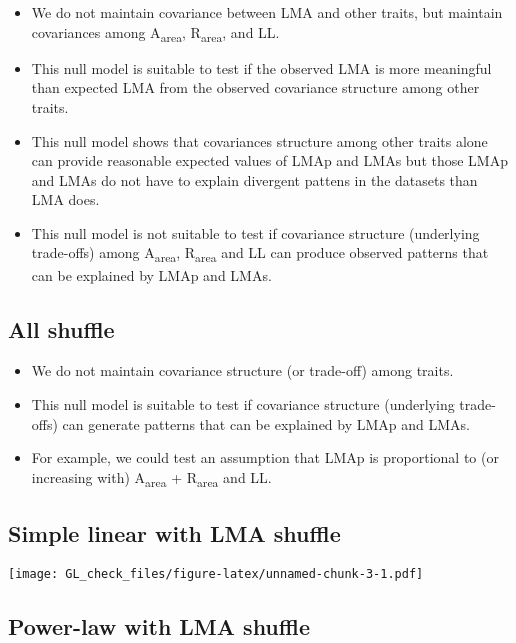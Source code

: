\documentclass[12pt,]{article}
\providecommand{\tightlist}{%
  \setlength{\itemsep}{0pt}\setlength{\parskip}{0pt}}
\theoremstyle{definition}
\theoremstyle{definition}
\theoremstyle{remark}
\begin{document}
\begin{itemize}
\tightlist
\item
  We do not maintain covariance between LMA and other traits, but
  maintain covariances among A\textsubscript{area},
  R\textsubscript{area}, and LL.
\item
  This null model is suitable to test if the observed LMA is more
  meaningful than expected LMA from the observed covariance structure
  among other traits.
\item
  This null model shows that covariances structure among other traits
  alone can provide reasonable expected values of LMAp and LMAs but
  those LMAp and LMAs do not have to explain divergent pattens in the
  datasets than LMA does.
\item
  This null model is not suitable to test if covariance structure
  (underlying trade-offs) among A\textsubscript{area},
  R\textsubscript{area} and LL can produce observed patterns that can be
  explained by LMAp and LMAs.
\end{itemize}

\subsection{All shuffle}\label{all-shuffle}

\begin{itemize}
\tightlist
\item
  We do not maintain covariance structure (or trade-off) among traits.
\item
  This null model is suitable to test if covariance structure
  (underlying trade-offs) can generate patterns that can be explained by
  LMAp and LMAs.
\item
  For example, we could test an assumption that LMAp is proportional to
  (or increasing with) A\textsubscript{area} + R\textsubscript{area} and
  LL.
\end{itemize}

\subsection{Simple linear with LMA
shuffle}\label{simple-linear-with-lma-shuffle}

\texttt{[image: GL\_check\_files/figure-latex/unnamed-chunk-3-1.pdf]}

\subsection{Power-law with LMA
shuffle}\label{power-law-with-lma-shuffle}
\end{document}
